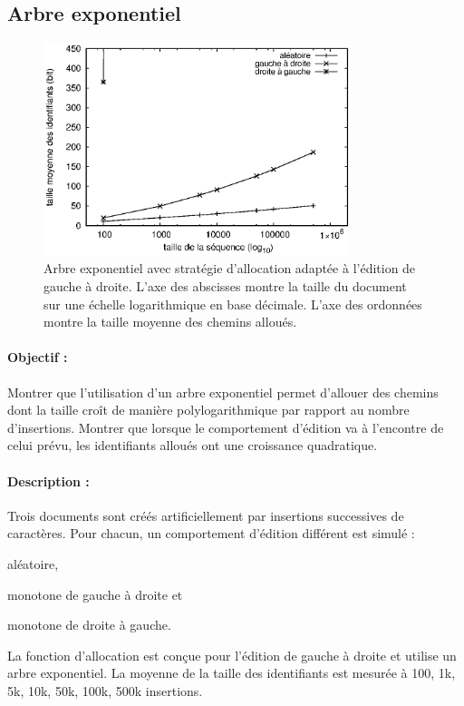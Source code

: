 \subsection{Arbre exponentiel}

\begin{figure}
  \begin{center}
    \includegraphics[width=0.8\textwidth]{img/lseq/double.eps}
    \caption[Influence de l'arbre exponentiel sur la taille des chemins]
    {\label{repl:img:exponentialtree} Arbre exponentiel avec stratégie
      d'allocation adaptée à l'édition de gauche à droite. L'axe des abscisses
      montre la taille du document sur une échelle logarithmique en base
      décimale. L'axe des ordonnées montre la taille moyenne des chemins
      alloués.}
  \end{center}
\end{figure}

\paragraph{Objectif :} Montrer que l'utilisation d'un arbre exponentiel permet
d'allouer des chemins dont la taille croît de manière polylogarithmique par rapport
au nombre d'insertions. Montrer que lorsque le comportement d'édition va à
l'encontre de celui prévu, les identifiants alloués ont une croissance
quadratique.

\paragraph{Description :} Trois documents sont créés artificiellement par
insertions successives de caractères. Pour chacun, un comportement d'édition
différent est simulé :
\begin{inparaenum}[(i)]
\item aléatoire,
\item monotone de gauche à droite et
\item monotone de droite à gauche.
\end{inparaenum}
La fonction d'allocation est conçue pour l'édition de gauche à droite et utilise
un arbre exponentiel.  La moyenne de la taille des identifiants est mesurée à
100, 1k, 5k, 10k, 50k, 100k, 500k insertions. 

